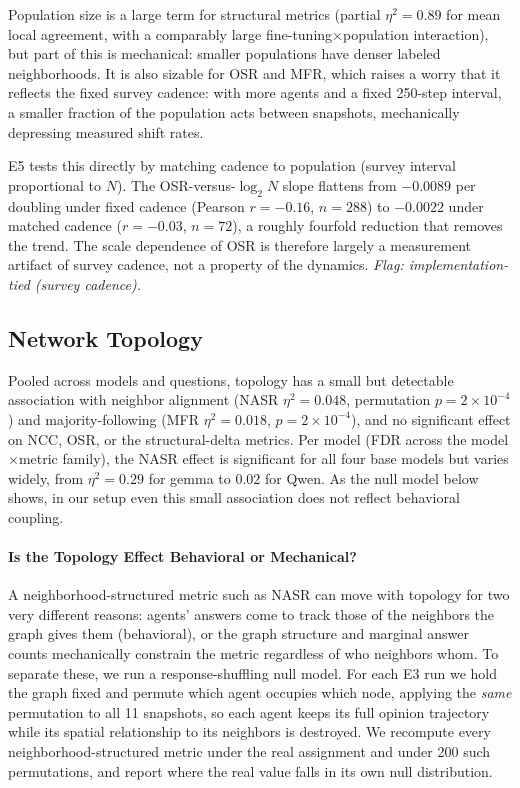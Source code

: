 \documentclass[letterpaper]{article} %
\begin{document}
Population size is a large term for structural metrics (partial $\eta^2 = 0.89$ for mean local agreement, with a comparably large fine-tuning$\times$population interaction), but part of this is mechanical: smaller populations have denser labeled neighborhoods. It is also sizable for OSR and MFR, which raises a worry that it reflects the fixed survey cadence: with more agents and a fixed 250-step interval, a smaller fraction of the population acts between snapshots, mechanically depressing measured shift rates.

E5 tests this directly by matching cadence to population (survey interval proportional to $N$). The OSR-versus-$\log_2 N$ slope flattens from $-0.0089$ per doubling under fixed cadence (Pearson $r = -0.16$, $n = 288$) to $-0.0022$ under matched cadence ($r = -0.03$, $n = 72$), a roughly fourfold reduction that removes the trend. The scale dependence of OSR is therefore largely a measurement artifact of survey cadence, not a property of the dynamics. \emph{Flag: implementation-tied (survey cadence).}

\subsection{Network Topology}
\label{sec:topology}

Pooled across models and questions, topology has a small but detectable association with neighbor alignment (NASR $\eta^2 = 0.048$, permutation $p = 2\times10^{-4}$) and majority-following (MFR $\eta^2 = 0.018$, $p = 2\times10^{-4}$), and no significant effect on NCC, OSR, or the structural-delta metrics. Per model (FDR across the model$\times$metric family), the NASR effect is significant for all four base models but varies widely, from $\eta^2 = 0.29$ for gemma to $0.02$ for Qwen. As the null model below shows, in our setup even this small association does not reflect behavioral coupling.

\paragraph{Is the Topology Effect Behavioral or Mechanical?}
A neighborhood-structured metric such as NASR can move with topology for two very different reasons: agents' answers come to track those of the neighbors the graph gives them (behavioral), or the graph structure and marginal answer counts mechanically constrain the metric regardless of who neighbors whom. To separate these, we run a response-shuffling null model. For each E3 run we hold the graph fixed and permute which agent occupies which node, applying the \emph{same} permutation to all 11 snapshots, so each agent keeps its full opinion trajectory while its spatial relationship to its neighbors is destroyed. We recompute every neighborhood-structured metric under the real assignment and under 200 such permutations, and report where the real value falls in its own null distribution.
\end{document}
